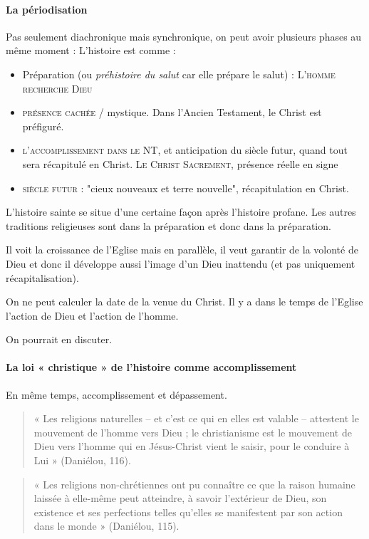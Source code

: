 \paragraph{La périodisation} Pas seulement diachronique mais synchronique, on peut avoir plusieurs phases au même moment : 
L'histoire est comme : 
\begin{itemize}
    \item Préparation (ou \textit{préhistoire du salut} car elle prépare le salut) : \textsc{L'homme recherche Dieu}
    \item \textsc{présence cachée} / mystique. Dans l'Ancien Testament, le Christ est préfiguré. 
    \item \textsc{l'accomplissement dans le NT}, 
et anticipation du siècle futur, quand tout sera récapitulé en Christ. \textsc{Le Christ Sacrement}, présence réelle en signe
    \item \textsc{siècle futur }: "cieux nouveaux et terre nouvelle", récapitulation en Christ.
\end{itemize}
L'histoire sainte se situe d'une certaine façon après l'histoire profane. Les autres traditions religieuses sont dans la préparation et donc dans la préparation.

Il voit la croissance de l'Eglise mais en parallèle, il veut garantir de la volonté de Dieu et donc il développe aussi l'image d'un Dieu inattendu (et pas uniquement récapitalisation).

On ne peut calculer la date de la venue du Christ. 
Il y a dans le temps de l'Eglise l'action de Dieu et l'action de l'homme. 




On pourrait en discuter.


\paragraph{La loi « christique » de l’histoire comme accomplissement }

En même temps, accomplissement et dépassement. 
\begin{quote}
    « Les religions naturelles – et c’est ce qui en elles est valable – attestent le mouvement de l’homme vers Dieu ; le christianisme est le mouvement de Dieu vers l’homme qui en Jésus-Christ vient le saisir, pour le conduire à Lui » (Daniélou, 116). 
\end{quote}

\begin{quote}
    « Les religions non-chrétiennes ont pu connaître ce que la raison humaine laissée à elle-même peut atteindre, à savoir l’extérieur de Dieu, son existence et ses perfections telles qu’elles se manifestent par son action dans le monde » (Daniélou, 115).  
\end{quote}

